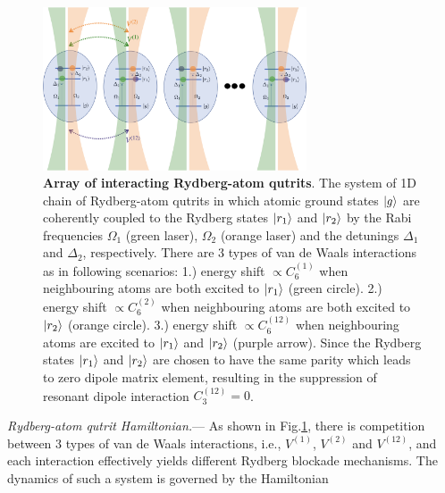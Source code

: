 \documentclass[%
 reprint,
nofootinbib,
 amsmath,amssymb,
 aps,
pra,
floatfix,
]{revtex4-2}
\begin{document}
\begin{figure}[ht!]
    \centering
    \includegraphics[width=7.8cm]{picture/many-qutrit.png}
    \caption{\textbf{Array of interacting Rydberg-atom qutrits}. The system of 1D chain of Rydberg-atom qutrits in which atomic ground states $\ket{g}$ are coherently coupled to the Rydberg states $\ket{r_1}$ and $\ket{r_2}$ by the Rabi frequencies $\Omega_1$ (green laser), $\Omega_2$ (orange laser) and the detunings $\Delta_1$ and $\Delta_2$, respectively. There are 3 types of van de Waals interactions as in following scenarios: 1.) energy shift $\propto C^{(1)}_6$ when neighbouring atoms are both excited to $\ket{r_1}$ (green circle). 2.) energy shift $\propto C^{(2)}_6$ when neighbouring atoms are both excited to $\ket{r_2}$ (orange circle). 3.) energy shift $\propto C^{(12)}_6$ when neighbouring atoms are excited to $\ket{r_1}$ and $\ket{r_2}$ (purple arrow). Since the Rydberg states $\ket{r_1}$ and $\ket{r_2}$ are chosen to have the same parity which leads to zero dipole matrix element, resulting in the suppression of resonant dipole interaction $C^{(12)}_3 = 0$. }
    \label{fig:many-qutrit}
\end{figure}

\emph{Rydberg-atom qutrit Hamiltonian.}--- As shown in Fig.\ref{fig:many-qutrit}, there is competition between 3 types of van de Waals interactions, i.e., $V^{(1)}$, $V^{(2)}$ and $V^{(12)}$, and each interaction effectively yields different Rydberg blockade mechanisms. The dynamics of such a system is governed by the Hamiltonian 
\end{document}
